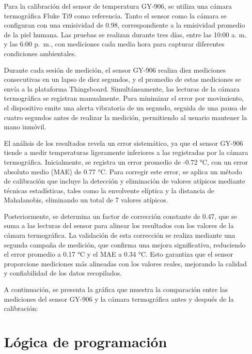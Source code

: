 \documentclass[
  letterpaper,
  DIV=11,
  numbers=noendperiod]{scrreport}
\begin{document}
Para la calibración del sensor de temperatura GY-906, se utiliza una
cámara termográfica Fluke Ti9 como referencia. Tanto el sensor como la
cámara se configuran con una emisividad de 0.98, correspondiente a la
emisividad promedio de la piel humana. Las pruebas se realizan durante
tres días, entre las 10:00 a. m. y las 6:00 p.~m., con mediciones cada
media hora para capturar diferentes condiciones ambientales.

Durante cada sesión de medición, el sensor GY-906 realiza diez
mediciones consecutivas en un lapso de diez segundos, y el promedio de
estas mediciones se envía a la plataforma Thingsboard. Simultáneamente,
las lecturas de la cámara termográfica se registran manualmente. Para
minimizar el error por movimiento, el dispositivo emite una alerta
vibratoria de un segundo, seguida de una pausa de cuatro segundos antes
de realizar la medición, permitiendo al usuario mantener la mano
inmóvil.

El análisis de los resultados revela un error sistemático, ya que el
sensor GY-906 tiende a medir temperaturas ligeramente inferiores a las
registradas por la cámara termográfica. Inicialmente, se registra un
error promedio de -0.72 °C, con un error absoluto medio (MAE) de 0.77
°C. Para corregir este error, se aplica un método de calibración que
incluye la detección y eliminación de valores atípicos mediante técnicas
estadísticas, tales como la envolvente elíptica y la distancia de
Mahalanobis, eliminando un total de 7 valores atípicos.

Posteriormente, se determina un factor de corrección constante de 0.47,
que se suma a las lecturas del sensor para alinear los resultados con
los valores de la cámara termográfica. La validación de esta corrección
se realiza mediante una segunda campaña de medición, que confirma una
mejora significativa, reduciendo el error promedio a 0.17 °C y el MAE a
0.34 °C. Esto garantiza que el sensor proporcione mediciones más
alineadas con los valores reales, mejorando la calidad y confiabilidad
de los datos recopilados.

A continuación, se presenta la gráfica que muestra la comparación entre
las mediciones del sensor GY-906 y la cámara termográfica antes y
después de la calibración:

\hypertarget{sec-programaciuxf3n}{%
\section{Lógica de programación}\label{sec-programaciuxf3n}}
\end{document}
